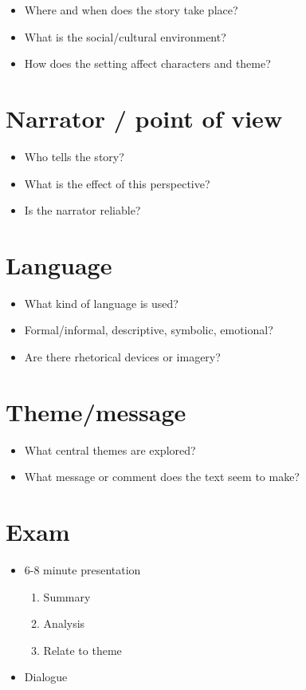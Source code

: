 \documentclass[11pt,a4paper,oneside]{book}
\begin{document}
\begin{itemize}
\item Where and when does the story take place?
\item What is the social/cultural environment?
\item How does the setting affect characters and theme?
\end{itemize}

\section*{Narrator / point of view}

\begin{itemize}
\item Who tells the story?
\item What is the effect of this perspective?
\item Is the narrator reliable?
\end{itemize}

\section*{Language}

\begin{itemize}
\item What kind of language is used?
\item Formal/informal, descriptive, symbolic, emotional?
\item Are there rhetorical devices or imagery?
\end{itemize}

\section*{Theme/message}

\begin{itemize}
\item What central themes are explored?
\item What message or comment does the text seem to make?
\end{itemize}

\section*{Exam}

\begin{itemize}
\item 6-8 minute presentation

\begin{enumerate}
\item Summary
\item Analysis
\item Relate to theme
\end{enumerate}

\item Dialogue
\end{itemize}
\end{document}
